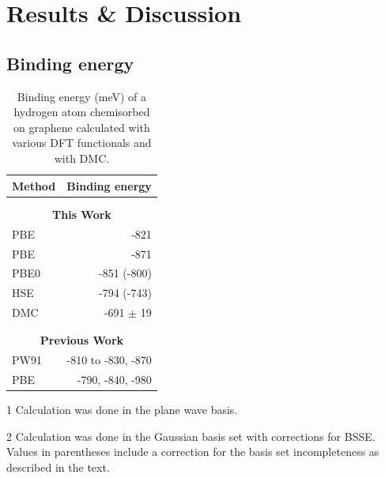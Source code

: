 
\section{Results \& Discussion}

\subsection{Binding energy}
 \begin{table}[ht]
     \caption{Binding energy (meV) of a hydrogen atom chemisorbed on graphene calculated with various DFT functionals and with DMC.}
    \centering
    \begin{tabular}{lr}%
    Method & Binding energy\\\hline \\\\[-2em]%
    \multicolumn{2}{c}{\bfseries This Work} \\
    PBE \tnote{1} & -821\\ %
    PBE\tnote{2} & -871\\ 
    PBE0\tnote{2}& -851 (-800)\\ 
    HSE\tnote{2}& -794 (-743)\\ 
    DMC  & -691 $\pm$ 19 \\ \hline \\\\[-2em]%
    \multicolumn{2}{c}{\bfseries Previous Work}\\
    PW91  &  -810 to -830\cite{10.1063/1.3187941}, -870\cite{10.1103/PhysRevLett.93.187202}\\
    PBE  & -790\cite{10.1103/PhysRevB.78.041402}, -840\cite{10.1063/1.3072333}, -980\cite{10.1088/0957-4484/19/15/155708}\\
     \hline%
    \end{tabular}
\label{tab:summary_energetics}
\begin{tablenotes}
\item[1] Calculation was done in the plane wave basis.
\item[2] Calculation was done in the Gaussian basis set with corrections for BSSE. Values in parentheses include a correction for the basis set incompleteness as described in the text.
\end{tablenotes}

 \end{table}
 


